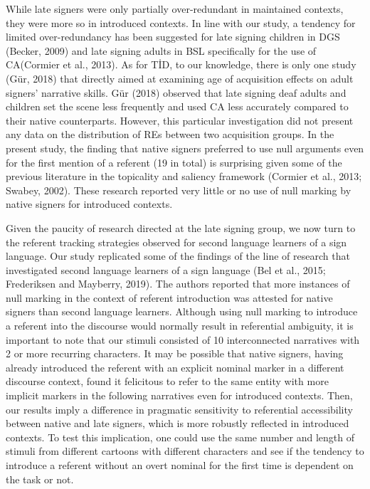 \documentclass[]{elsarticle} %
\begin{document}
While late signers were only partially over-redundant in maintained
contexts, they were more so in introduced contexts. In line with our
study, a tendency for limited over-redundancy has been suggested for
late signing children in DGS (Becker, 2009) and late signing adults in
BSL specifically for the use of CA(Cormier et al., 2013). As for TİD, to
our knowledge, there is only one study (Gür, 2018) that directly aimed
at examining age of acquisition effects on adult signers' narrative
skills. Gür (2018) observed that late signing deaf adults and children
set the scene less frequently and used CA less accurately compared to
their native counterparts. However, this particular investigation did
not present any data on the distribution of REs between two acquisition
groups. In the present study, the finding that native signers preferred
to use null arguments even for the first mention of a referent (19 in
total) is surprising given some of the previous literature in the
topicality and saliency framework (Cormier et al., 2013; Swabey, 2002).
These research reported very little or no use of null marking by native
signers for introduced contexts.

Given the paucity of research directed at the late signing group, we now
turn to the referent tracking strategies observed for second language
learners of a sign language. Our study replicated some of the findings
of the line of research that investigated second language learners of a
sign language (Bel et al., 2015; Frederiksen and Mayberry, 2019). The
authors reported that more instances of null marking in the context of
referent introduction was attested for native signers than second
language learners. Although using null marking to introduce a referent
into the discourse would normally result in referential ambiguity, it is
important to note that our stimuli consisted of 10 interconnected
narratives with 2 or more recurring characters. It may be possible that
native signers, having already introduced the referent with an explicit
nominal marker in a different discourse context, found it felicitous to
refer to the same entity with more implicit markers in the following
narratives even for introduced contexts. Then, our results imply a
difference in pragmatic sensitivity to referential accessibility between
native and late signers, which is more robustly reflected in introduced
contexts. To test this implication, one could use the same number and
length of stimuli from different cartoons with different characters and
see if the tendency to introduce a referent without an overt nominal for
the first time is dependent on the task or not.
\end{document}
